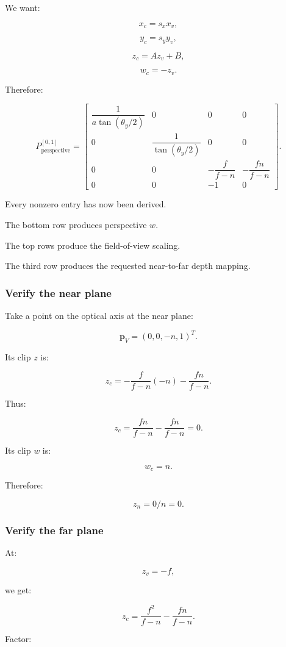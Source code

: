 We want:

\[
 x_c=s_xx_v,
\]

\[
 y_c=s_yy_v,
\]

\[
 z_c=Az_v+B,
\]

\[
 w_c=-z_v.
\]

Therefore:

\[
 \boxed{ P_{\mathrm{perspective}}^{[0,1]}= \begin{bmatrix} \dfrac1{a\tan(\theta_y/2)}&0&0&0\\ 0&\dfrac1{\tan(\theta_y/2)}&0&0\\ 0&0&-\dfrac f{f-n}&-\dfrac{fn}{f-n}\\ 0&0&-1&0 \end{bmatrix} }.
\]

Every nonzero entry has now been derived.

The bottom row produces perspective \(w\).

The top rows produce the field-of-view scaling.

The third row produces the requested near-to-far depth mapping.

\subsubsection{Verify the near plane}\label{verify-the-near-plane}

Take a point on the optical axis at the near plane:

\[
 \mathbf p_V=(0,0,-n,1)^T.
\]

Its clip \(z\) is:

\[
 z_c= -\frac f{f-n}(-n)-\frac{fn}{f-n}.
\]

Thus:

\[
 z_c= \frac{fn}{f-n}-\frac{fn}{f-n}=0.
\]

Its clip \(w\) is:

\[
 w_c=n.
\]

Therefore:

\[
 \boxed{z_n=0/n=0}.
\]

\subsubsection{Verify the far plane}\label{verify-the-far-plane}

At:

\[
 z_v=-f,
\]

we get:

\[
 z_c= \frac{f^2}{f-n}-\frac{fn}{f-n}.
\]

Factor:


